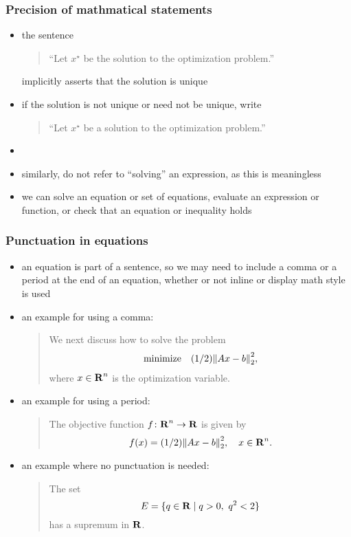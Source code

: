 \documentclass[usepdftitle=false]{beamer}
\begin{document}
\begin{frame}
    \frametitle{Precision of mathmatical statements}

    \begin{itemize}\itemsep=12pt
        \item the sentence
            \begin{quote}
                ``Let $x^\star$ be the solution to the optimization problem.''
            \end{quote}
            implicitly asserts that the solution is unique
        \item if the solution is not unique or need not be unique, write
            \begin{quote}
                ``Let $x^\star$ be a solution to the optimization problem.''
            \end{quote}
        \item[]
        \item similarly, do not refer to ``solving'' an expression, as this is meaningless
        \item we can solve an equation or set of equations, evaluate an expression or function, or check that an equation or inequality holds
    \end{itemize}
\end{frame}

\begin{frame}
    \frametitle{Punctuation in equations}

    \begin{itemize}\itemsep=10pt
        \item an equation is part of a sentence, so we may need to include a comma or a period at the end of an equation, whether or not inline or display math style is used
        \item an example for using a comma:
            \begin{quote}
                We next discuss how to solve the problem
                \[
                    \begin{array}{ll}
                        \mbox{minimize} & (1/2){\lVert Ax - b \rVert}_2^2,
                    \end{array}
                \]
                where $x \in {\bf R{}}^n$ is the optimization variable.
            \end{quote}
        \item an example for using a period:
            \begin{quote}
                The objective function $f \colon {\bf R{}}^n \to {\bf R{}}$ is given by
                \[
                    f(x) = (1/2){\lVert Ax - b \rVert}_2^2,\quad x \in {\bf R{}}^n.
                \]
            \end{quote}
        \item an example where no punctuation is needed:
            \begin{quote}
                The set
                \[
                    E = \{q \in {\bf R{}} \mid q > 0,\ q^2 < 2\}
                \]
                has a supremum in ${\bf R{}}$.
            \end{quote}
    \end{itemize}
\end{frame}
\end{document}
